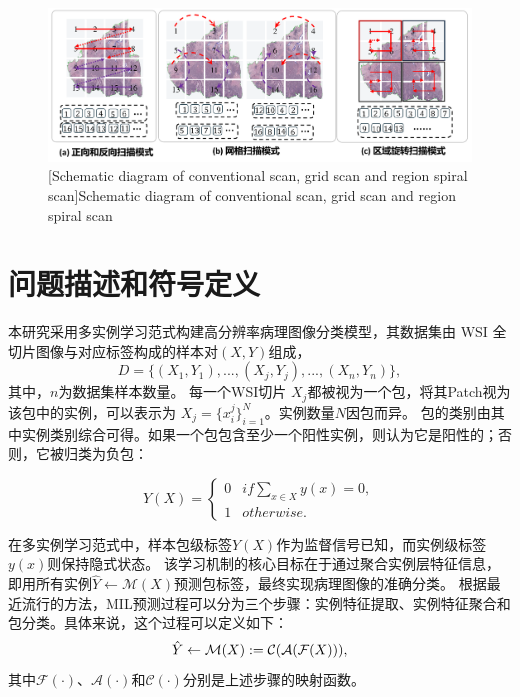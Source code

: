 \begin{figure}[h]
  \centering
  \includegraphics[width=\columnwidth]{figures/多扫描模式.pdf}
  [Schematic diagram of conventional scan, grid scan and region spiral scan]{Schematic diagram of conventional scan, grid scan and region spiral scan}
  \vspace{-10pt}
  \label{figure3: 扫描示意图}
  \end{figure}

\section[\hspace{-2pt}问题描述和符号定义]{{\heiti{} \hspace{-8pt}问题描述和符号定义}}\label{section3: 问题描述和符号定义}

本研究采用多实例学习范式构建高分辨率病理图像分类模型，其数据集由 WSI 全切片图像与对应标签构成的样本对$(X,Y)$组成，
\begin{equation}
  D=\{(X_1,Y_1),...,(X_j,Y_j),...,(X_n,Y_n)\},
\end{equation}
其中，$n$为数据集样本数量。
每一个WSI切片 $X_j$都被视为一个包，将其Patch视为该包中的实例，可以表示为 $X_j=\{x_i^j\}_{i=1}^N$。实例数量$N$因包而异。
包的类别由其中实例类别综合可得。如果一个包包含至少一个阳性实例，则认为它是阳性的；否则，它被归类为负包：

\begin{equation}
  Y(X)=\left \{
  \begin{array}{cl}
      0 &  if  \sum_{x \in X} y(x) = 0, \\
      1 & otherwise.
  \end{array}\right.
  \label{eq}
\end{equation}

在多实例学习范式中，样本包级标签$Y(X)$作为监督信号已知，而实例级标签$y(x)$则保持隐式状态。
该学习机制的核心目标在于通过聚合实例层特征信息，即用所有实例$\hat{Y}\gets\mathcal{M}\left(X\right)$预测包标签，最终实现病理图像的准确分类。
根据最近流行的方法，MIL预测过程可以分为三个步骤：实例特征提取、实例特征聚合和包分类。具体来说，这个过程可以定义如下：
\begin{equation}
  \hat{\mathnormal{Y}} \leftarrow \mathcal{M}(X):=\mathcal{C}(\mathcal{A}(\mathcal{F}(X))),
\label{eq1}
\end{equation}
其中$\mathcal{F}\left(\cdot\right)$、$\mathcal{A}\left(\cdot\right)$和$\mathcal{C}\left(\cdot\right)$分别是上述步骤的映射函数。

